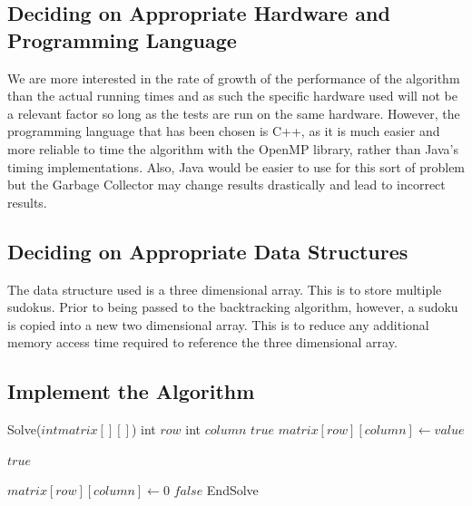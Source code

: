 \documentclass{article}
\begin{document}
\newpage

\subsection{Deciding on Appropriate Hardware and Programming Language}
We are more interested in the rate of growth of the performance of the algorithm than the actual running times and as such the specific hardware used will not be a relevant factor so long as the tests are run on the same hardware. However, the programming language that has been chosen is C++, as it is much easier and more reliable to time the algorithm with the OpenMP library, rather than Java's timing implementations. Also, Java would be easier to use for this sort of problem but the Garbage Collector may change results drastically and lead to incorrect results.

\subsection{Deciding on Appropriate Data Structures}
The data structure used is a three dimensional array. This is to store multiple sudokus. Prior to being passed to the backtracking algorithm, however, a sudoku is copied into a new two dimensional array. This is to reduce any additional memory access time required to reference the three dimensional array.

\newpage

\subsection{Implement the Algorithm}

    \begin{algorithmic}[1]
    
    \STATE Solve($int matrix[][]$)
        \STATE int $row$
        \STATE int $column$
\newline
            \RETURN $true$
        \ENDIF
\newline
                \STATE $matrix[row][column]\gets value$
            
                    \RETURN $true$
                \ENDIF
                
                \STATE $matrix[row][column]\gets 0$
            \ENDIF
        \ENDFOR
\newline
        \RETURN $false$
    \STATE EndSolve
\newline
    \end{algorithmic}
\end{document}
